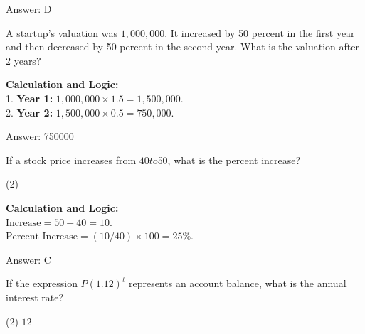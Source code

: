 \documentclass[11pt,paper=a4,answers]{exam}
\begin{document}
\begin{questions}
\begin{solution}
\vspace{30pt}

Answer: \colorbox{yellow!100}{D}
\end{solution}

\vspace{60pt}

\question
A startup's valuation was $1,000,000$. It increased by 50 percent  in the first year and then decreased by 50 percent  in the second year. What is the valuation after 2 years?

\begin{solution}
\textbf{Calculation and Logic:} \\
1. \textbf{Year 1:} $1,000,000 \times 1.5 = 1,500,000$. \\
2. \textbf{Year 2:} $1,500,000 \times 0.5 = 750,000$.

\vspace{30pt}

Answer: \colorbox{yellow!100}{750000}
\end{solution}

\vspace{60pt}

\question
If a stock price increases from $40 to $50, what is the percent increase?
\begin{tasks}(2)
\end{tasks}

\begin{solution}
\textbf{Calculation and Logic:} \\
$\text{Increase} = 50 - 40 = 10$. \\
$\text{Percent Increase} = (10 / 40) \times 100 = 25\%$.

\vspace{30pt}

Answer: \colorbox{yellow!100}{C}
\end{solution}

\vspace{60pt}

\question
If the expression $P(1.12)^t$ represents an account balance, what is the annual interest rate?
\begin{tasks}(2)
    \task $12$
\end{tasks}


\end{questions}
\end{document}

